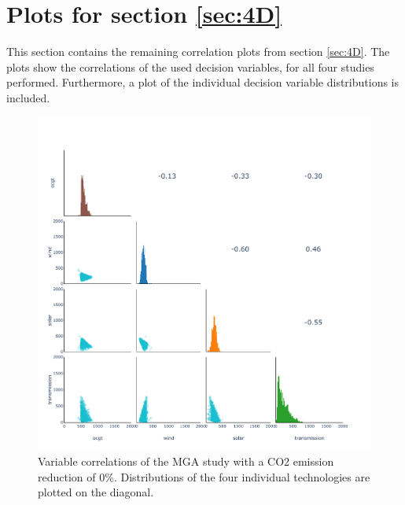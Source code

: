 \chapter{Plots for section \ref{sec:4D} }

This section contains the remaining correlation plots from section \ref{sec:4D}. The plots show the correlations of the used decision variables, for all four studies performed. Furthermore, a plot of the individual decision variable distributions is included. 

\begin{figure}[h]\centerfloat
	\includegraphics[width=1.2\textwidth,trim={0 0cm 0 0cm},clip]{./Images/corelation_4D_00}
	\caption{Variable correlations of the MGA study with a CO2 emission reduction of 0\%. Distributions of the four individual technologies are plotted on the diagonal.}
\end{figure}

